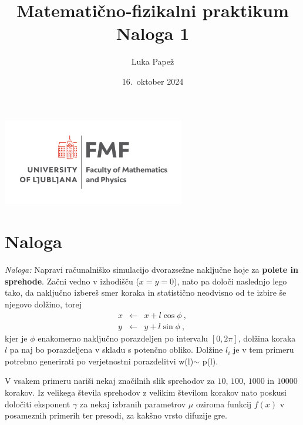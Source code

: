 \documentclass{article}
\begin{document}
\title{Matematično-fizikalni praktikum \\[3mm] \large Naloga 1}
\author{Luka Papež}
\date{16.\ oktober 2024}

\begin{center}
    \includegraphics[width=8cm]{logo-fmf.png}
\end{center}

{
    \let\newpage\relax
    \maketitle
}

\maketitle
\newpage
\section{Naloga}
{\sl Naloga:} Napravi računalniško simulacijo
dvorazsežne naključne hoje za \textbf{polete in sprehode}.  Začni vedno v izhodišču
($x=y=0$), nato pa določi naslednjo lego tako, da naključno
izbereš smer koraka in statistično neodvisno od te izbire
še njegovo dolžino, torej
\begin{eqnarray*}
x &\leftarrow& x + l \cos\phi \>, \\
y &\leftarrow& y + l \sin\phi \>,
\end{eqnarray*}
kjer je $\phi$ enakomerno naključno porazdeljen po intervalu
$[0,2\pi]$, dolžina koraka $l$ pa naj bo porazdeljena
v skladu s potenčno obliko. 
Dolžine $l_i$ je v tem primeru potrebno generirati po verjetnostni
porazdelitvi w(l)$\sim$ p(l).

V vsakem primeru nariši nekaj značilnih slik sprehodov za $10$, $100$, $1000$ in $10000$ korakov. Iz velikega števila sprehodov z velikim številom korakov nato poskusi določiti eksponent $\gamma$ za nekaj izbranih parametrov $\mu$ oziroma funkcij $f(x)$ v posameznih primerih ter presodi, za kakšno vrsto difuzije gre.
\end{document}
